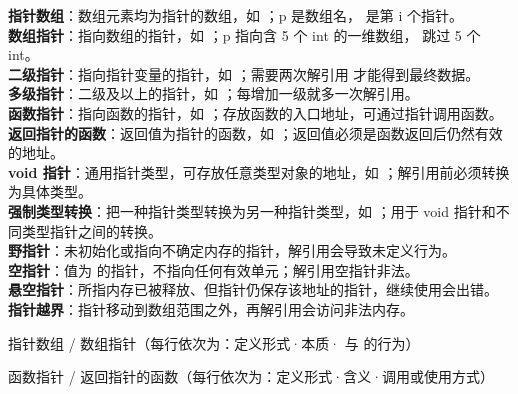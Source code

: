 \documentclass[a4paper,11pt]{article}
\begin{document}
\begin{keyterms}
\textbf{指针数组}：数组元素均为指针的数组，如 ；p 是数组名， 是第 i 个指针。\\
\textbf{数组指针}：指向数组的指针，如 ；p 指向含 5 个 int 的一维数组， 跳过 5 个 int。\\
\textbf{二级指针}：指向指针变量的指针，如 ；需要两次解引用  才能得到最终数据。\\
\textbf{多级指针}：二级及以上的指针，如 ；每增加一级就多一次解引用。\\
\textbf{函数指针}：指向函数的指针，如 ；存放函数的入口地址，可通过指针调用函数。\\
\textbf{返回指针的函数}：返回值为指针的函数，如 ；返回值必须是函数返回后仍然有效的地址。\\
\textbf{void 指针}：通用指针类型，可存放任意类型对象的地址，如 ；解引用前必须转换为具体类型。\\
\textbf{强制类型转换}：把一种指针类型转换为另一种指针类型，如 ；用于 void 指针和不同类型指针之间的转换。\\
\textbf{野指针}：未初始化或指向不确定内存的指针，解引用会导致未定义行为。\\
\textbf{空指针}：值为  的指针，不指向任何有效单元；解引用空指针非法。\\
\textbf{悬空指针}：所指内存已被释放、但指针仍保存该地址的指针，继续使用会出错。\\
\textbf{指针越界}：指针移动到数组范围之外，再解引用会访问非法内存。
\end{keyterms}

\begin{contrast}{指针数组 / 数组指针（每行依次为：定义形式·本质· 与  的行为）}
\end{contrast}

\begin{contrast}{函数指针 / 返回指针的函数（每行依次为：定义形式·含义·调用或使用方式）}
\end{contrast}
\end{document}
